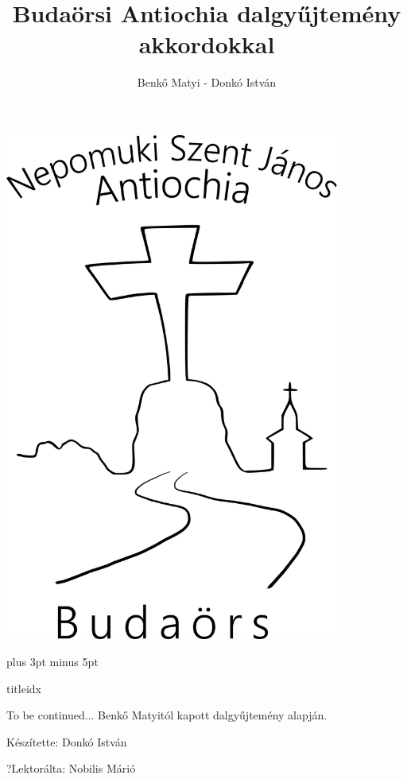 \documentclass[a5paper,twoside]{article}
\title{Budaörsi Antiochia dalgyűjtemény akkordokkal}
\author{Benkő Matyi - Donkó István}
\begin{document}
  \begin{titlepage}  
    \setlength{\oddsidemargin}{-1.3cm}

    \vspace*{0.75cm}
    \includegraphics[width=11cm]{Logo_07_final}
  \end{titlepage}



  \versesep=12pt plus 3pt minus 5pt
  
  \begin{songs}{titleidx}
    
  \end{songs}

  To be continued...
  \vfill
  Benkő Matyitól kapott dalgyűjtemény alapján.
  
  Készítette: Donkó István
  
  ?Lektorálta: Nobilis Márió
\end{document}
